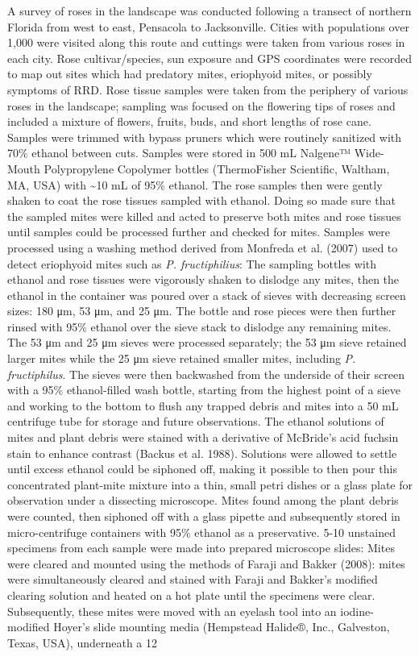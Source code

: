\documentclass[12pt,final,CPage]{ufthesis}
\begin{document}
{  A survey of roses in the landscape was conducted following a transect of northern Florida from west to east, Pensacola to Jacksonville. Cities with populations over 1,000 were visited along this route and cuttings were taken from various roses in each city. Rose cultivar/species, sun exposure and GPS coordinates were recorded to map out sites which had predatory mites, eriophyoid mites, or possibly symptoms of RRD. Rose tissue samples were taken from the periphery of various roses in the landscape; sampling was focused on the flowering tips of roses and included a mixture of flowers, fruits, buds, and short lengths of rose cane. Samples were trimmed with bypass pruners which were routinely sanitized with 70\% ethanol between cuts. Samples were stored in 500 \si{\milli\liter} Nalgene™ Wide-Mouth Polypropylene Copolymer bottles (ThermoFisher Scientific, Waltham, MA, USA) with \textasciitilde10 \si{\milli\liter} of 95\% ethanol. The rose samples then were gently shaken to coat the rose tissues sampled with ethanol. Doing so made sure that the sampled mites were killed and acted to preserve both mites and rose tissues until samples could be processed further and checked for mites. Samples were processed using a washing method derived from Monfreda et al. (2007) used to detect eriophyoid mites such as \emph{P. fructiphilius}: The sampling bottles with ethanol and rose tissues were vigorously shaken to dislodge any mites, then the ethanol in the container was poured over a stack of sieves with decreasing screen sizes: 180 \si{\micro\metre}, 53 \si{\micro\metre}, and 25 \si{\micro\metre}. The bottle and rose pieces were then further rinsed with 95\% ethanol over the sieve stack to dislodge any remaining mites. The 53 \si{\micro\metre} and 25 \si{\micro\metre} sieves were processed separately; the 53 \si{\micro\metre} sieve retained larger mites while the 25 \si{\micro\metre} sieve retained smaller mites, including \emph{P. fructiphilus}. The sieves were then backwashed from the underside of their screen with a 95\% ethanol-filled wash bottle, starting from the highest point of a sieve and working to the bottom to flush any trapped debris and mites into a 50 \si{\milli\liter} centrifuge tube for storage and future observations. The ethanol solutions of mites and plant debris were stained with a derivative of McBride's acid fuchsin stain to enhance contrast (Backus et al. 1988). Solutions were allowed to settle until excess ethanol could be siphoned off, making it possible to then pour this concentrated plant-mite mixture into a thin, small petri dishes or a glass plate for observation under a dissecting microscope. Mites found among the plant debris were counted, then siphoned off with a glass pipette and subsequently stored in micro-centrifuge containers with 95\% ethanol as a preservative. 5-10 unstained specimens from each sample were made into prepared microscope slides: Mites were cleared and mounted using the methods of Faraji and Bakker (2008): mites were simultaneously cleared and stained with Faraji and Bakker's modified clearing solution and heated on a hot plate until the specimens were clear. Subsequently, these mites were moved with an eyelash tool into an iodine-modified Hoyer's slide mounting media (Hempstead Halide®, Inc., Galveston, Texas, USA), underneath a 12 }
\end{document}
